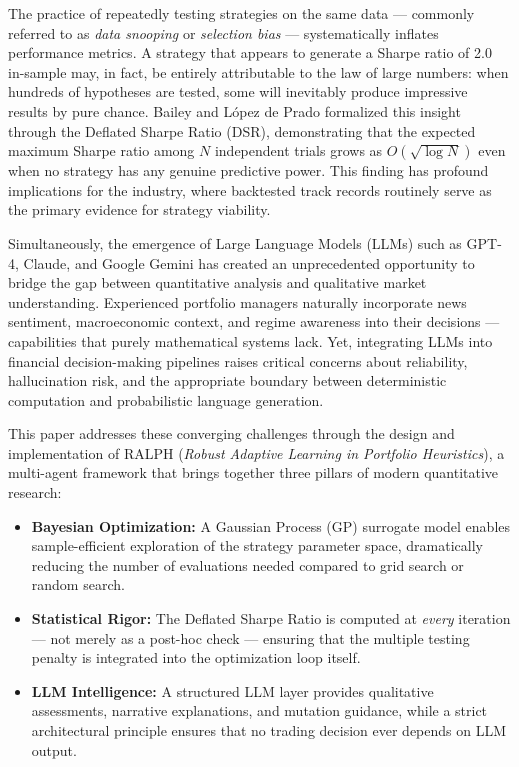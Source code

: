 \documentclass[conference]{IEEEtran}
\begin{document}
The practice of repeatedly testing strategies on the same data --- commonly referred to as \textit{data snooping} or \textit{selection bias} --- systematically inflates performance metrics. A strategy that appears to generate a Sharpe ratio of 2.0 in-sample may, in fact, be entirely attributable to the law of large numbers: when hundreds of hypotheses are tested, some will inevitably produce impressive results by pure chance. Bailey and L\'{o}pez de Prado \cite{bailey2014deflated} formalized this insight through the Deflated Sharpe Ratio (DSR), demonstrating that the expected maximum Sharpe ratio among $N$ independent trials grows as $O(\sqrt{\log N})$ even when no strategy has any genuine predictive power. This finding has profound implications for the industry, where backtested track records routinely serve as the primary evidence for strategy viability.

Simultaneously, the emergence of Large Language Models (LLMs) such as GPT-4, Claude, and Google Gemini has created an unprecedented opportunity to bridge the gap between quantitative analysis and qualitative market understanding. Experienced portfolio managers naturally incorporate news sentiment, macroeconomic context, and regime awareness into their decisions --- capabilities that purely mathematical systems lack. Yet, integrating LLMs into financial decision-making pipelines raises critical concerns about reliability, hallucination risk, and the appropriate boundary between deterministic computation and probabilistic language generation.

This paper addresses these converging challenges through the design and implementation of RALPH (\textit{Robust Adaptive Learning in Portfolio Heuristics}), a multi-agent framework that brings together three pillars of modern quantitative research:

\begin{itemize}
    \item \textbf{Bayesian Optimization:} A Gaussian Process (GP) surrogate model enables sample-efficient exploration of the strategy parameter space, dramatically reducing the number of evaluations needed compared to grid search or random search.
    \item \textbf{Statistical Rigor:} The Deflated Sharpe Ratio is computed at \textit{every} iteration --- not merely as a post-hoc check --- ensuring that the multiple testing penalty is integrated into the optimization loop itself.
    \item \textbf{LLM Intelligence:} A structured LLM layer provides qualitative assessments, narrative explanations, and mutation guidance, while a strict architectural principle ensures that no trading decision ever depends on LLM output.
\end{itemize}
\end{document}

